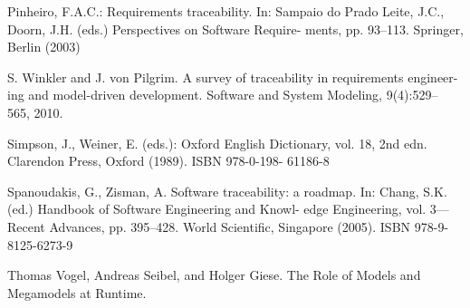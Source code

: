 \documentclass[runningheads,a4paper]{llncs}
\begin{document}
\begin{thebibliography}{1}
Pinheiro, F.A.C.: Requirements traceability. In: Sampaio do Prado
Leite, J.C., Doorn, J.H. (eds.) Perspectives on Software Require-
ments, pp. 93–113. Springer, Berlin (2003)


S. Winkler and J. von Pilgrim. A survey of traceability in requirements engineer- ing and model-driven development. Software and System Modeling, 9(4):529– 565, 2010. 

Simpson, J., Weiner, E. (eds.): Oxford English Dictionary, vol. 18,
2nd edn. Clarendon Press, Oxford (1989). ISBN 978-0-198-
61186-8

Spanoudakis, G., Zisman, A. Software traceability: a roadmap. In:
Chang, S.K. (ed.) Handbook of Software Engineering and Knowl-
edge Engineering, vol. 3—Recent Advances, pp. 395–428. World
Scientific, Singapore (2005). ISBN 978-9-8125-6273-9

Thomas Vogel, Andreas Seibel, and Holger Giese. The Role of Models and Megamodels at Runtime.


\end{thebibliography}
\end{document}
